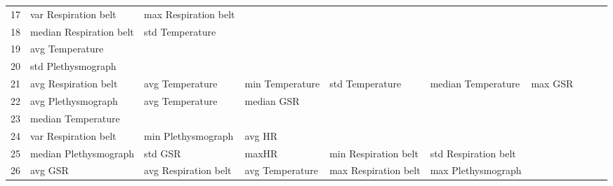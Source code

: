 \begin{landscape}
\begin{table}[]
\begin{tabular}{l|llllllll}
17       & var Respiration belt    & max Respiration belt  &                         &                         &                         &                       &                      &          &                      &        \\
18       & median Respiration belt & std Temperature       &                         &                         &                         &                       &                      &          &                      &        \\
19       & avg Temperature         &                       &                         &                         &                         &                       &                      &          &                      &        \\
20       & std Plethysmograph      &                       &                         &                         &                         &                       &                      &          &                      &        \\
21       & avg Respiration belt    & avg Temperature       & min Temperature         & std Temperature         & median Temperature      & max GSR               &                      &          &                      &        \\
22       & avg Plethysmograph      & avg Temperature       & median GSR              &                         &                         &                       &                      &          &                      &        \\
23       & median Temperature      &                       &                         &                         &                         &                       &                      &          &                      &        \\
24       & var Respiration belt    & min Plethysmograph    & avg HR                  &                         &                         &                       &                      &          &                      &        \\
25       & median Plethysmograph   & std GSR               & maxHR                   & min Respiration belt    & std Respiration belt    &                       &                      &          &                      &        \\
26       & avg GSR                 & avg Respiration belt  & avg Temperature         & max Respiration belt    & max Plethysmograph      &                       &                      &          &                      &        \\

\end{tabular}
\end{table}
\end{landscape}
